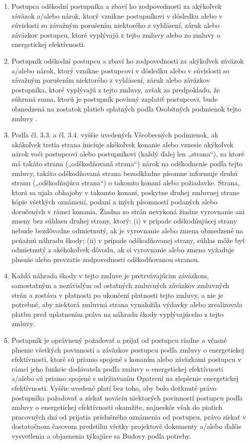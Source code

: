 \documentclass[a4paper]{article}
\begin{document}
\begin{multicols}{2}
\begin{enumerate}
    \item{Postupca odškodní postupníka a zbaví ho zodpovednosti za akýkoľvek záväzok a/alebo nárok, ktorý vznikne postupníkovi v dôsledku alebo v súvislosti so závažným porušením niektorého z vyhlásení, záruk alebo záväzkov postupcu, ktoré vyplývajú z tejto zmluvy alebo zo zmluvy o energetickej efektívnosti.}
    \item{Postupník odškodní postupcu a zbaví ho zodpovednosti za akýkoľvek záväzok a/alebo nárok, ktorý vznikne postupcovi v dôsledku alebo v súvislosti so závažným porušením niektorého z vyhlásení, záruk alebo záväzkov postupníka, ktoré vyplývajú z tejto zmluvy, avšak za predpokladu, že súhrnná suma, ktorú je postupník povinný zaplatiť postupcovi, bude obmedzená na zostatok platieb splatných podľa Osobitných podmienok tejto zmluvy . }
    \item{Podľa čl. 3.3. a čl. 3.4. vyššie uvedených Všeobecných podmienok, ak akákoľvek tretia strana iniciuje akékoľvek konanie alebo vznesie akýkoľvek nárok voči postupcovi alebo postupníkovi (každý ďalej len „strana“), za ktoré má takáto strana („odškodňovaná strana“) nárok na odškodnenie podľa tejto zmluvy, takáto odškodňovaná  strana bezodkladne písomne informuje druhú stranu („odškodňujúca strana“) o takomto konaní alebo požiadavke. Strana, ktorá sa ujala obhajoby v takomto konaní, poskytne druhej zmluvnej strane kópie všetkých oznámení, podaní a iných písomností podaných alebo doručených v rámci konania. Žiadna zo strán nevykoná žiadne vyrovnanie ani zmeny bez súhlasu druhej strany, ktorý: (i) v prípade odškodňujúcej strany nebude bezdôvodne odmietnutý, ak je vyrovnanie alebo zmena obmedzené na peňažnú náhradu škody; (ii) v prípade odškodňovanej strany, súhlas môže byť odmietnutý z akéhokoľvek dôvodu, ak si vyrovnanie alebo zmena vyžaduje plnenie alebo prevzatie zodpovednosti odškodňovanou stranou.}
    \item{Každá náhrada škody v tejto zmluve je pretrvávajúcim záväzkom, samostatným a nezávislým od ostatných zmluvných záväzkov zmluvných strán a zostáva v platnosti po ukončení platnosti tejto zmluvy, a nie je potrebné, aby niektorá zmluvná strana vynaložila  výdavky alebo zrealizovala platbu pred uplatnením práva na náhradu škody vyplývajúceho z tejto zmluvy. }
    \item{Postupník je oprávnený požadovať a prijať od postupcu riadne a včasné plnenie všetkých povinností a záväzkov postupcu podľa zmluvy o energetickej efektívnosti, ktoré sú priamo spojené s konaním alebo záväzkami postupcu v rámci jeho funkcie dodávateľa podľa zmluvy o energetickej efektívnosti a/alebo sú priamo spojené s udržiavaním Opatrení na zlepšenie energetickej efektívnosti. Vyššie uvedené platí bez toho, aby bolo dotknuté právo postupníka požadovať a získať nováciu niektorých povinností postupcu podľa zmluvy o energetickej efektívnosti okamžite, najneskôr však do piatich pracovných dní od prijatia príslušného oznámenia od postupcu, právo získať v dostatočnom časovom predstihu všetky projektové dokumenty a/alebo ďalšie vysvetlenia a objasnenia týkajúce sa Budovy podľa potreby.}

\end{enumerate}
\end{multicols}
\end{document}
